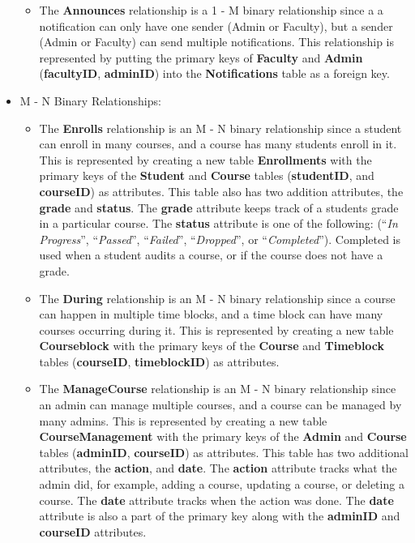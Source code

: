 \documentclass{report}
\begin{document}
\begin{itemize}
\begin{itemize}
        \item The \textbf{Announces} relationship is a 1 - M binary relationship since a a notification can only have one sender (Admin or Faculty), but a sender (Admin or Faculty) can send multiple notifications. This relationship is represented by putting the primary keys of \textbf{Faculty} and \textbf{Admin} (\textbf{facultyID}, \textbf{adminID}) into the \textbf{Notifications} table as a foreign key.
    \end{itemize}

    \item M - N Binary Relationships:
    \begin{itemize}
        \item The \textbf{Enrolls} relationship is an M - N binary relationship since a student can enroll in many courses, and a course has many students enroll in it. This is represented by creating a new table \textbf{Enrollments} with the primary keys of the \textbf{Student} and \textbf{Course} tables (\textbf{studentID}, and \textbf{courseID}) as attributes. This table also has two addition attributes, the \textbf{grade} and \textbf{status}. The \textbf{grade} attribute keeps track of a students grade in a particular course. The \textbf{status} attribute is one of the following: (``\textit{In Progress}'', ``\textit{Passed}'', ``\textit{Failed}'', ``\textit{Dropped}'', or ``\textit{Completed}''). Completed is used when a student audits a course, or if the course does not have a grade.
        \item The \textbf{During} relationship is an M - N binary relationship since a course can happen in multiple time blocks, and a time block can have many courses occurring during it. This is represented by creating a new table \textbf{Courseblock} with the primary keys of the \textbf{Course} and \textbf{Timeblock} tables (\textbf{courseID}, \textbf{timeblockID}) as attributes.
        \item The \textbf{ManageCourse} relationship is an M - N binary relationship since an admin can manage multiple courses, and a course can be managed by many admins. This is represented by creating a new table \textbf{CourseManagement} with the primary keys of the \textbf{Admin} and \textbf{Course} tables (\textbf{adminID}, \textbf{courseID}) as attributes. This table has two additional attributes, the \textbf{action}, and \textbf{date}. The \textbf{action} attribute tracks what the admin did, for example, adding a course, updating a course, or deleting a course. The \textbf{date} attribute tracks when the action was done. The \textbf{date} attribute is also a part of the primary key along with the \textbf{adminID} and \textbf{courseID} attributes.

\end{itemize}
\end{itemize}
\end{document}
